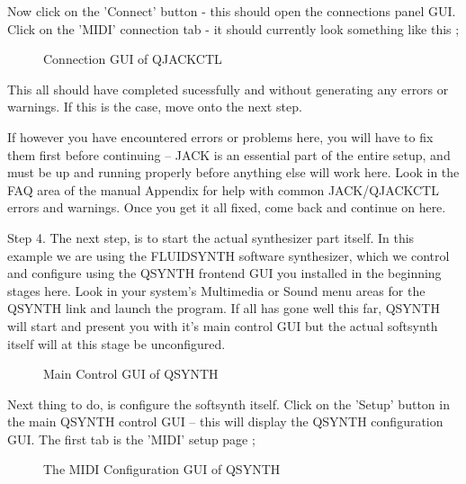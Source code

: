 \documentclass[letterpaper]{report}
\begin{document}
Now click on the 'Connect' button - this should open the connections
panel GUI. Click on the 'MIDI' connection tab - it should currently
look something like this ;

\begin{figure}%
%
%
\caption{Connection  GUI of QJACKCTL}%
\end{figure}%


This all should have completed sucessfully and without generating any
errors or warnings. If this is the case, move onto the next step.


If however you have encountered errors or problems here, you will have to
fix them first before continuing -- JACK is an essential part of the
entire setup, and must be up and running properly before anything else
will work here. Look in the FAQ area of the manual Appendix for help with
common JACK/QJACKCTL errors and warnings. Once you get it all fixed, come
back and continue on here.


Step 4. The next step, is to start the actual synthesizer part itself.
In this example we are using the FLUIDSYNTH software synthesizer, which 
we control and configure using the QSYNTH frontend GUI you installed in
the beginning stages here. Look in your system's Multimedia or Sound menu
areas for the QSYNTH link and launch the program. If all has gone well this
far, QSYNTH will start and present you with it's main control GUI but the
actual softsynth itself will at this stage be unconfigured.


\begin{figure}%
%
%
\caption{Main Control GUI of QSYNTH}%
\end{figure}%


Next thing to do, is configure the softsynth itself. Click on the 'Setup'
button in the main QSYNTH control GUI -- this will display the QSYNTH
configuration GUI. The first tab is the 'MIDI' setup page ;


\begin{figure}%
%
%
\caption{The MIDI Configuration GUI of QSYNTH}%
\end{figure}%
\end{document}

